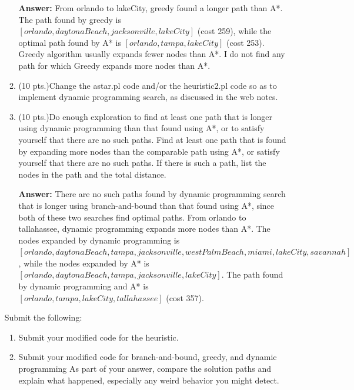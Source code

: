 \documentclass{article}%
\begin{document}
\begin{enumerate}
\begin{enumerate}
  		\textbf{Answer:} From orlando to lakeCity, greedy found a longer path than A*. The path found by greedy is $\left[orlando, daytonaBeach, jacksonville, lakeCity \right]$ (cost 259), while the optimal path found by A* is $\left[orlando, tampa, lakeCity \right]$ (cost 253). Greedy algorithm usually expands fewer nodes than A*. I do not find any path for which Greedy expands more nodes than A*.
  		
  		\item (10 pts.)Change the astar.pl code and/or the heuristic2.pl code so as to implement dynamic programming search, as discussed in the web notes.
  		\item (10 pts.)Do enough exploration to find at least one path that is longer using dynamic programming than that found using A*, or to satisfy yourself that there are no such paths. Find at least one path that is found by expanding more nodes than the comparable path using A*, or satisfy yourself that there are no such paths. If there is such a path, list the nodes in the path and the total distance.
  		
  		
  		\textbf{Answer:} There are no such paths found by dynamic programming search that is longer using branch-and-bound than that found using A*, since both of these two searches find optimal paths. From orlando to tallahassee, dynamic programming expands more nodes than A*. The nodes expanded by dynamic programming is \\ $\left[orlando, daytonaBeach, tampa, jacksonville, westPalmBeach,miami,lakeCity,savannah \right]$, while the nodes expanded by A* is $\left[orlando, daytonaBeach, tampa, jacksonville,lakeCity \right]$. The path found by dynamic programming and A* is $\left[orlando, tampa, lakeCity, tallahassee \right]$ (cost 357).
  		 
	\end{enumerate}
	
Submit the following:
	\begin{enumerate}
  		\item Submit your modified code for the heuristic. 
		\item Submit your modified code for branch-and-bound, greedy, and dynamic programming As part of your answer, compare the solution paths and explain what happened, especially any weird behavior you might detect. 
	\end{enumerate}
	

\end{enumerate}
\end{document}
